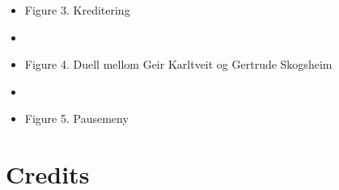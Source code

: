 \documentclass[paper=a4]{article}
\begin{document}
\begin{center}
{\begin{itemize}
				\item {\hfil Figure 3. Kreditering} 
				\bigskip
				\bigskip
				\bigskip
				\item{}
				\item {\hfil Figure 4. Duell mellom Geir Karltveit og Gertrude Skogsheim} 
				\bigskip
				\bigskip
				\bigskip
				\item{}
				\item {\hfil Figure 5. Pausemeny} 
				\bigskip
				\bigskip
				\bigskip
			\end{itemize}
		}
	\end{center}

\newpage
\section{Credits}
\end{document}
